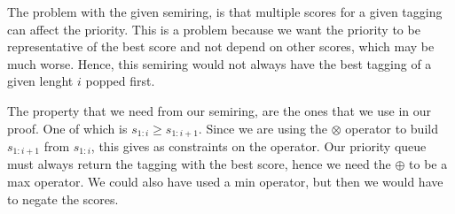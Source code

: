 \documentclass[a4paper,12pt]{ETHexercise}
\begin{document}
\begin{question}
\begin{subquestion}
		The problem with the given semiring, is that multiple scores for a given tagging can affect the priority. This is a problem because we want the priority to be representative of the best score and not depend on other scores, which may be much worse. Hence, this semiring would not always have the best tagging of a given lenght $i$ popped first.
	\end{subquestion}
	\begin{subquestion}
		The property that we need from our semiring, are the ones that we use in our proof. One of which is $s_{1:i} \geq s_{1:i+1}$. Since we are using the $\otimes$ operator to build $s_{1:i+1}$ from $s_{1:i}$, this gives as constraints on the operator. Our priority queue must always return the tagging with the best score, hence we need the $\oplus$ to be a max operator. We could also have used a min operator, but then we would have to negate the scores.\\
	\end{subquestion}
\end{question}
\end{document}
